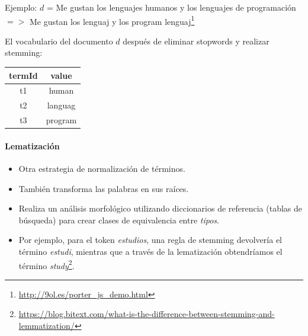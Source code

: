 \documentclass{book}
\begin{document}
Ejemplo: $d$ = Me gustan los lenguajes humanos y los lenguajes de programación $=>$ Me gustan los lenguaj y los program lenguaj\footnote{\url{http://9ol.es/porter_js_demo.html}}

El vocabulario del documento $d$ después de eliminar stopwords y realizar stemming:

\begin{table}
\centering
\begin{tabular}{c|c}
\hline
termId & value \\
\hline
t1 & human \\
t2 & languag \\
t3 & program\\
\hline
\end{tabular}
\end{table}


\paragraph{Lematización}

\begin{itemize}
   \item Otra estrategia de normalización de términos.
   \item También transforma las palabras en sus raíces.
   \item Realiza un análisis morfológico utilizando diccionarios de referencia (tablas de búsqueda) para crear clases de equivalencia entre \emph{tipos}.
   \item Por ejemplo, para el token \emph{estudios}, una regla de stemming devolvería el término \emph{estudi}, mientras que a través de la lematización obtendríamos el término \emph{study}\footnote{\url{https://blog.bitext.com/what-is-the-difference-between-stemming-and-lemmatization/}}.
\end{itemize}
\end{document}
